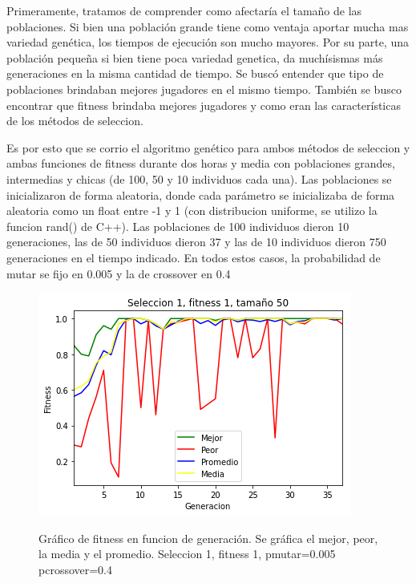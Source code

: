 \documentclass[A4paper,oneside,fleqn,11pt]{article}
\theoremstyle{definition}
\begin{document}
Primeramente, tratamos de comprender como afectaría el tamaño de las poblaciones. Si bien una población grande tiene como ventaja aportar mucha mas variedad genética, los tiempos de ejecución son mucho mayores. Por su parte, una población pequeña si bien tiene poca variedad genetica, da muchísismas más generaciones en la misma cantidad de tiempo. Se buscó entender que tipo de poblaciones brindaban mejores jugadores en el mismo tiempo. También se busco encontrar que fitness brindaba mejores jugadores y como eran las características de los métodos de seleccion.

Es por esto que se corrio el algoritmo genético para ambos métodos de seleccion y ambas funciones de fitness durante dos horas y media con poblaciones grandes, intermedias y chicas (de 100, 50 y 10 individuos cada una). Las poblaciones se inicializaron de forma aleatoria, donde cada parámetro se inicializaba de forma aleatoria como un float entre -1 y 1 (con distribucion uniforme, se utilizo la funcion rand() de C++). Las poblaciones de 100 individuos dieron 10 generaciones, las de 50 individuos dieron 37 y las de 10 individuos dieron 750 generaciones en el tiempo indicado. En todos estos casos, la probabilidad de mutar se fijo en 0.005 y la de crossover en 0.4




\begin{figure}[H]
	\captionsetup[subfigure]{position=b}
	\centering
		{\includegraphics[width=0.3\linewidth]{s1f1t50.png}}
	\caption{Gráfico de fitness en funcion de generación. Se gráfica el mejor, peor, la media y el promedio. Seleccion 1, fitness 1, pmutar=0.005 pcrossover=0.4}
\end{figure}
\end{document}
